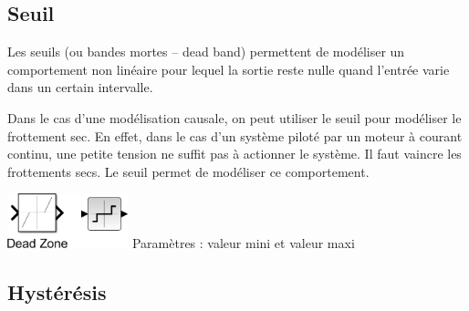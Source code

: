 \documentclass[10pt,fleqn]{article} %
\begin{document}
\subsection{Seuil}

\noindent \begin{minipage}[c]{.54\linewidth}
\indent Les seuils (ou bandes mortes -- dead band) permettent de modéliser un comportement non linéaire pour lequel la sortie reste nulle quand l'entrée varie dans un certain intervalle. 


Dans le cas d'une modélisation causale, on peut utiliser le seuil pour modéliser le frottement sec. En effet, dans le cas d'un système piloté par un moteur à courant continu, une petite tension ne suffit pas à actionner le système. Il faut vaincre les frottements secs. Le seuil permet de modéliser ce comportement.

\end{minipage}
\hfill
\begin{minipage}[c]{.18\linewidth}
\begin{center}
\includegraphics[width=3.5cm]{images/seuil}
Paramètres : valeur mini et valeur maxi
\end{center}
\end{minipage}
\hfill
\begin{minipage}[c]{.22\linewidth}
\begin{center}
\end{center}
\end{minipage}

\subsection{Hystérésis}
\end{document}
